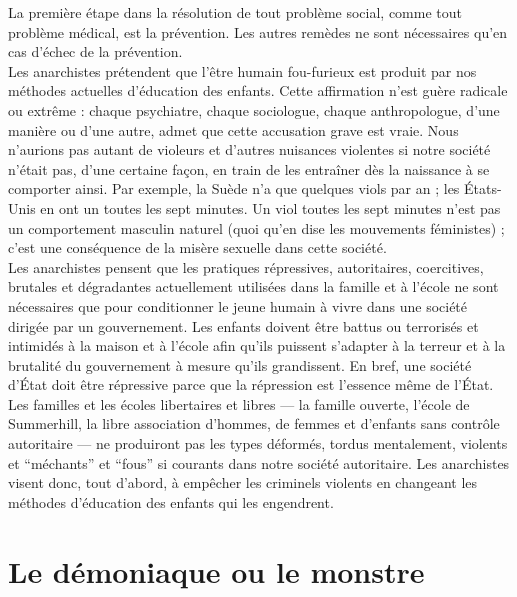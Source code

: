 La première étape dans la résolution de tout problème social, comme tout problème médical, est la prévention. Les autres remèdes ne sont nécessaires qu'en cas d'échec de la prévention.\\
Les anarchistes prétendent que l'être humain fou-furieux est produit par nos méthodes actuelles d'éducation des enfants. Cette affirmation n'est guère radicale ou extrême : chaque psychiatre, chaque sociologue, chaque anthropologue, d'une manière ou d'une autre, admet que cette accusation grave est vraie. Nous n'aurions pas autant de violeurs et d'autres nuisances violentes si notre société n'était pas, d'une certaine façon, en train de les entraîner dès la naissance à se comporter ainsi. Par exemple, la Suède n'a que quelques viols par an ; les États-Unis en ont un toutes les sept minutes. Un viol toutes les sept minutes n'est pas un comportement masculin naturel (quoi qu'en dise les mouvements féministes) ; c'est une conséquence de la misère sexuelle dans cette société.\\
Les anarchistes pensent que les pratiques répressives, autoritaires, coercitives, brutales et dégradantes actuellement utilisées dans la famille et à l'école ne sont nécessaires que pour conditionner le jeune humain à vivre dans une société dirigée par un gouvernement. Les enfants doivent être battus ou terrorisés et intimidés à la maison et à l'école afin qu'ils puissent s'adapter à la terreur et à la brutalité du gouvernement à mesure qu'ils grandissent. En bref, une société d'État doit être répressive parce que la répression est l'essence même de l'État.\\
Les familles et les écoles libertaires et libres --- la famille ouverte, l'école de Summerhill, la libre association d'hommes, de femmes et d'enfants sans contrôle autoritaire --- ne produiront pas les types déformés, tordus mentalement, violents et ``méchants'' et ``fous'' si courants dans notre société autoritaire. Les anarchistes visent donc, tout d'abord, à empêcher les criminels violents en changeant les méthodes d'éducation des enfants qui les engendrent.

\section*{Le démoniaque ou le monstre}

